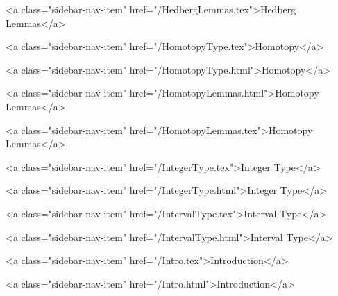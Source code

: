       
        
          <a class="sidebar-nav-item" href="/HedbergLemmas.tex">Hedberg Lemmas</a>
        
      
    
      
        
          <a class="sidebar-nav-item" href="/HomotopyType.tex">Homotopy</a>
        
      
    
      
        
          <a class="sidebar-nav-item" href="/HomotopyType.html">Homotopy</a>
        
      
    
      
        
          <a class="sidebar-nav-item" href="/HomotopyLemmas.html">Homotopy Lemmas</a>
        
      
    
      
        
          <a class="sidebar-nav-item" href="/HomotopyLemmas.tex">Homotopy Lemmas</a>
        
      
    
      
        
          <a class="sidebar-nav-item" href="/IntegerType.tex">Integer Type</a>
        
      
    
      
        
          <a class="sidebar-nav-item" href="/IntegerType.html">Integer Type</a>
        
      
    
      
        
          <a class="sidebar-nav-item" href="/IntervalType.tex">Interval Type</a>
        
      
    
      
        
          <a class="sidebar-nav-item" href="/IntervalType.html">Interval Type</a>
        
      
    
      
        
          <a class="sidebar-nav-item" href="/Intro.tex">Introduction</a>
        
      
    
      
        
          <a class="sidebar-nav-item" href="/Intro.html">Introduction</a>
        
      
    

